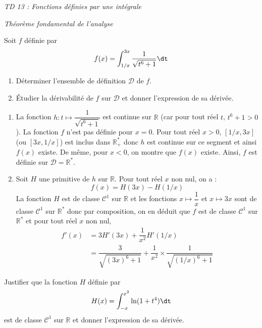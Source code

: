 \documentclass[a4paper,10pt]{report}
\begin{document}
\everymath{\displaystyle}

\begin{center}
\textit{{ {\huge TD 13 : Fonctions définies par une intégrale}}}
\end{center}


\bigskip

\begin{center}
\textit{{ {\large Théorème fondamental de l'analyse}}}
\end{center}

\medskip

\begin{Exa} Soit $f$ définie par 
$$f(x) = \int_{1/x}^{3x}\frac{1}{\sqrt{t^6+1}}\dt$$ 
\begin{enumerate}
\item Déterminer l'ensemble de définition $\mathcal{D}$ de $f$.
\item Étudier la dérivabilité de $f$ sur $\mathcal{D}$ et donner l'expression de sa dérivée.
\end{enumerate}
\end{Exa} 

\corr 

\begin{enumerate}
\item La fonction $h : t \mapsto \dfrac{1}{\sqrt{t^6+1}}$ est continue sur $\mathbb{R}$ (car pour tout réel $t$, $t^6+1>0$). La fonction $f$ n'est pas définie pour $x=0$. Pour tout réel $x>0$, $[1/x,3x]$ (ou $[3x, 1/x]$) est inclus dans $\mathbb{R}_+^*$ donc $h$ est continue sur ce segment et ainsi $f(x)$ existe.  De même, pour $x<0$, on montre que $f(x)$ existe. Ainsi, $f$ est définie sur $\mathcal{D} = \mathbb{R}^*$.
\item Soit $H$ une primitive de $h$ sur $\mathbb{R}$. Pour tout réel $x$ non nul, on a :
$$ f(x) = H(3x)-H(1/x)$$
La fonction $H$ est de classe $\mathcal{C}^1$ sur $\mathbb{R}$ et les fonctions $x \mapsto \dfrac{1}{x}$ et $x \mapsto 3x$ sont de classe $\mathcal{C}^1$ sur $\mathbb{R}^*$ donc par composition, on en déduit que $f$ est de classe $\mathcal{C}^1$ sur $\mathbb{R}^*$ et pour tout réel $x$ non nul,
\begin{align*}
f'(x) & = 3 H'(3x)  + \dfrac{1}{x^2} H'(1/x) \\
& = \dfrac{3}{\sqrt{(3x)^6+1}} + \dfrac{1}{x^2} \times \dfrac{1}{\sqrt{(1/x)^6+1}} 
\end{align*}
\end{enumerate}

\begin{Exa} Justifier que la fonction $H$ définie par 
$$H(x) = \int_{-x}^{x^2} \ln(1+t^4) \dt$$
est de classe $\mathcal{C}^1$ sur $\mathbb{R}$ et donner l'expression de sa dérivée.
\end{Exa}
\end{document}
